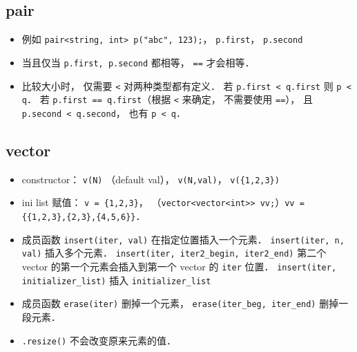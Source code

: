 
\begin{issues}
\issueDraft
\end{issues}

\subsection{pair}
\begin{itemize}
\item 例如 \verb|pair<string, int> p("abc", 123);|， \verb|p.first|， \verb|p.second|
\item 当且仅当 \verb|p.first, p.second| 都相等， \verb|==| 才会相等．
\item 比较大小时， 仅需要 \verb|<| 对两种类型都有定义． 若 \verb|p.first < q.first| 则 \verb|p < q|． 若 \verb|p.first == q.first|（根据 \verb|<| 来确定， 不需要使用 \verb|==|）， 且 \verb|p.second < q.second|， 也有 \verb|p < q|．
\end{itemize}

\subsection{vector}
\begin{itemize}
\item constructor： \verb|v(N)| （default val）， \verb|v(N,val)|， \verb|v({1,2,3})|
\item ini list 赋值： \verb|v = {1,2,3}|， （\verb|vector<vector<int>> vv;|）\verb|vv = {{1,2,3},{2,3},{4,5,6}}|．
\item 成员函数 \verb|insert(iter, val)| 在指定位置插入一个元素． \verb|insert(iter, n, val)| 插入多个元素． \verb|insert(iter, iter2_begin, iter2_end)| 第二个 vector 的第一个元素会插入到第一个 vector 的 \verb|iter| 位置． \verb|insert(iter, initializer_list)| 插入 \verb|initializer_list|
\item 成员函数 \verb|erase(iter)| 删掉一个元素， \verb|erase(iter_beg, iter_end)| 删掉一段元素．
\item \verb|.resize()| 不会改变原来元素的值．
\end{itemize}

